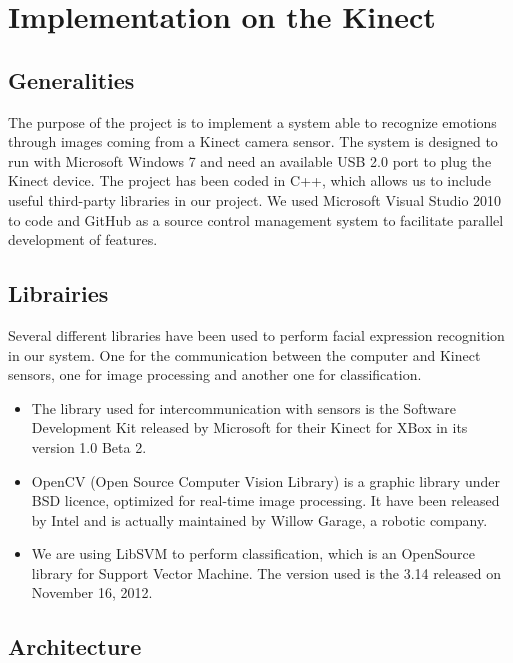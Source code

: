 \chapter{Implementation on the Kinect}
\label{chap:implementation_kinect}

\section{Generalities}
\vspace{\baselineskip}
\noindent The purpose of the project is to implement a system able to recognize emotions through images coming from a Kinect camera sensor. The system is designed to run with Microsoft Windows 7 and need an available USB 2.0 port to plug the Kinect device. The project has been coded in C++, which allows us to include useful third-party libraries in our project.
\newline We used Microsoft Visual Studio 2010 to code and GitHub as a source control management system to facilitate parallel development of features.

\section{Librairies}
\vspace{\baselineskip}
\noindent Several different libraries have been used to perform facial expression recognition in our system. One for the communication between the computer and Kinect sensors, one for image processing and another one for classification.


\begin{itemize}
  \item The library used for intercommunication with sensors is the Software Development Kit released by Microsoft for their Kinect for XBox in its version 1.0 Beta 2.
  \item OpenCV (Open Source Computer Vision Library) is a graphic library under BSD licence, optimized for real-time image processing. It have been released by Intel and is actually maintained by Willow Garage, a robotic company.
  \item We are using LibSVM to perform classification, which is an OpenSource library for Support Vector Machine. The version used is the 3.14 released on November 16, 2012.
\end{itemize}

\section{Architecture}

